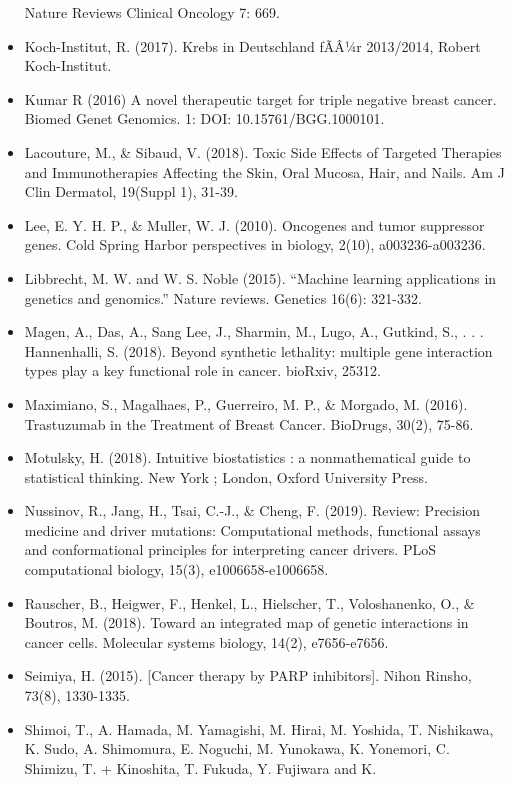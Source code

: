 \documentclass[]{article}
\begin{document}
\begin{itemize}
  Nature Reviews Clinical Oncology 7: 669.
\item
  Koch-Institut, R. (2017). Krebs in Deutschland fÃÂ¼r 2013/2014,
  Robert Koch-Institut.
\item
  Kumar R (2016) A novel therapeutic target for triple negative breast
  cancer. Biomed Genet Genomics. 1: DOI: 10.15761/BGG.1000101.
\item
  Lacouture, M., \& Sibaud, V. (2018). Toxic Side Effects of Targeted
  Therapies and Immunotherapies Affecting the Skin, Oral Mucosa, Hair,
  and Nails. Am J Clin Dermatol, 19(Suppl 1), 31-39.
\item
  Lee, E. Y. H. P., \& Muller, W. J. (2010). Oncogenes and tumor
  suppressor genes. Cold Spring Harbor perspectives in biology, 2(10),
  a003236-a003236.
\item
  Libbrecht, M. W. and W. S. Noble (2015). ``Machine learning
  applications in genetics and genomics.'' Nature reviews. Genetics
  16(6): 321-332.
\item
  Magen, A., Das, A., Sang Lee, J., Sharmin, M., Lugo, A., Gutkind, S.,
  . . . Hannenhalli, S. (2018). Beyond synthetic lethality: multiple
  gene interaction types play a key functional role in cancer. bioRxiv,
  25312.
\item
  Maximiano, S., Magalhaes, P., Guerreiro, M. P., \& Morgado, M. (2016).
  Trastuzumab in the Treatment of Breast Cancer. BioDrugs, 30(2), 75-86.
\item
  Motulsky, H. (2018). Intuitive biostatistics : a nonmathematical guide
  to statistical thinking. New York ; London, Oxford University Press.
\item
  Nussinov, R., Jang, H., Tsai, C.-J., \& Cheng, F. (2019). Review:
  Precision medicine and driver mutations: Computational methods,
  functional assays and conformational principles for interpreting
  cancer drivers. PLoS computational biology, 15(3), e1006658-e1006658.
\item
  Rauscher, B., Heigwer, F., Henkel, L., Hielscher, T., Voloshanenko,
  O., \& Boutros, M. (2018). Toward an integrated map of genetic
  interactions in cancer cells. Molecular systems biology, 14(2),
  e7656-e7656.
\item
  Seimiya, H. (2015). {[}Cancer therapy by PARP inhibitors{]}. Nihon
  Rinsho, 73(8), 1330-1335.
\item
  Shimoi, T., A. Hamada, M. Yamagishi, M. Hirai, M. Yoshida, T.
  Nishikawa, K. Sudo, A. Shimomura, E. Noguchi, M. Yunokawa, K.
  Yonemori, C. Shimizu, T. + Kinoshita, T. Fukuda, Y. Fujiwara and K.

\end{itemize}
\end{document}
